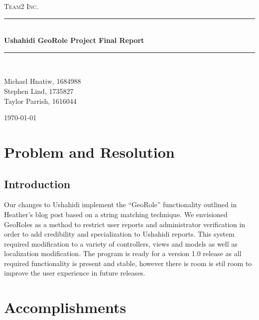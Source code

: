 \documentclass{article}
\newcommand{\HRule}{\rule{\linewidth}{0.5mm}}
\begin{document}
\begin{titlepage}
\begin{center}
\textsc{\LARGE Team2 Inc.}\\[1.5cm]

\HRule \\[1.4cm]
{ \huge \bfseries Ushahidi GeoRole Project Final Report}\\[0.4cm]

\HRule \\[1.5cm]

\begin{minipage}{0.4\textwidth}
\begin{center}
\large Michael Hnatiw, 1684988\\
\large Stephen Lind, 1735827\\
\large Taylor Parrish, 1616044\\
\end{center}
\end{minipage}

\vfill
{\large \today}
\end{center}
\end{titlepage}

\section{Problem and Resolution}
\subsection{Introduction}
Our changes to Ushahidi implement the ``GeoRole'' functionality outlined in Heather's blog post based on a string matching technique. We envisioned GeoRoles as a method to restrict user reports and administrator verification in order to add credibility and specialization to Ushahidi reports. This system required modification to a variety of controllers, views and models as well as localization modification. The program is ready for a version 1.0 release as all required functionality is present and stable, however there is room is stil room to improve the user experience in future releases.

\section{Accomplishments}
\end{document}

